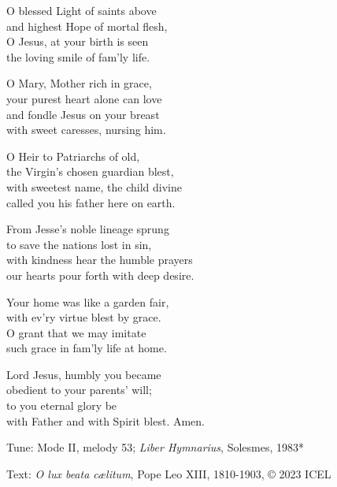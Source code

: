 \hymn

\settowidth{\versewidth}{with Father and with Spirit blest. Amen.}

\begin{hymnverse}%
O blessed Light of saints above\\
and highest Hope of mortal flesh,\\
O Jesus, at your birth is seen\\
the loving smile of fam’ly life.

O Mary, Mother rich in grace,\\
your purest heart alone can love\\
and fondle Jesus on your breast\\
with sweet caresses, nursing him.

O Heir to Patriarchs of old,\\
the Virgin’s chosen guardian blest,\\
with sweetest name, the child divine\\
called you his father here on earth.

From Jesse’s noble lineage sprung\\
to save the nations lost in sin,\\
with kindness hear the humble prayers\\
our hearts pour forth with deep desire.

Your home was like a garden fair,\\
with ev’ry virtue blest by grace.\\
O grant that we may imitate\\
such grace in fam’ly life at home.

Lord Jesus, humbly you became\\
obedient to your parents’ will;\\
to you eternal glory be\\
with Father and with Spirit blest. Amen.
\end{hymnverse}

\begin{hymnsource}
Tune: Mode II, melody 53; \emph{Liber Hymnarius}, Solesmes, 1983*

Text: \emph{O lux beata cælitum}, Pope Leo XIII, 1810-1903, © 2023 ICEL




\end{hymnsource}